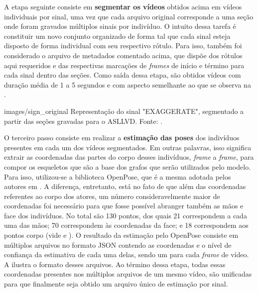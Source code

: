 A etapa seguinte consiste em \textbf{segmentar os vídeos} obtidos acima em vídeos individuais por sinal, uma vez que cada arquivo original corresponde a uma seção onde foram gravados múltiplos sinais por indivíduo. O intuito dessa tarefa é constituir um novo conjunto organizado de forma tal que cada sinal esteja disposto de forma individual com seu respectivo rótulo. Para isso, também foi considerado o arquivo de metadados comentado acima, que dispõe dos rótulos aqui requeridos e das respectivas marcações de \textit{frames} de início e término para cada sinal dentro das seções. Como saída dessa etapa, são obtidos vídeos com duração média de 1 a 5 segundos e com aspecto semelhante ao que se observa na .

    {images/sign_original}
    {Representação do sinal "EXAGGERATE", segmentado a partir das seções gravadas para o ASLLVD. Fonte: \cite{athitsos-asllvd-2008}.}

O terceiro passo consiste em realizar a \textbf{estimação das poses} dos indivíduos presentes em cada um dos vídeos segmentados. Em outras palavras, isso significa extrair as coordenadas das partes do corpo desses indivíduos, \textit{frame} a \textit{frame}, para compor os esqueletos que são a base dos grafos que serão utilizados pelo modelo. Para isso, utilizou-se a biblioteca OpenPose, que é a mesma adotada pelos autores em \cite{st-gcn-2018}. A diferença, entretanto, está no fato de que além das coordenadas referentes ao corpo dos atores, um número consideravelmente maior de coordenadas foi necessário para que fosse possível abranger também as mãos e face dos indivíduos. No total são 130 pontos, dos quais 21 correspondem a cada uma das mãos; 70 correspondem às coordenadas da face; e 18 correspondem aos pontos corpo (vide  e ). O resultado da estimação pelo OpenPose consiste em múltiplos arquivos no formato JSON contendo as coordenadas e o nível de confiança da estimativa de cada uma delas, sendo um para cada \textit{frame} de vídeo. A  ilustra o formato desses arquivos. Ao término dessa etapa, todas essas coordenadas presentes nos múltiplos arquivos de um mesmo vídeo, são unificadas para que finalmente seja obtido um arquivo único de estimação por sinal.

